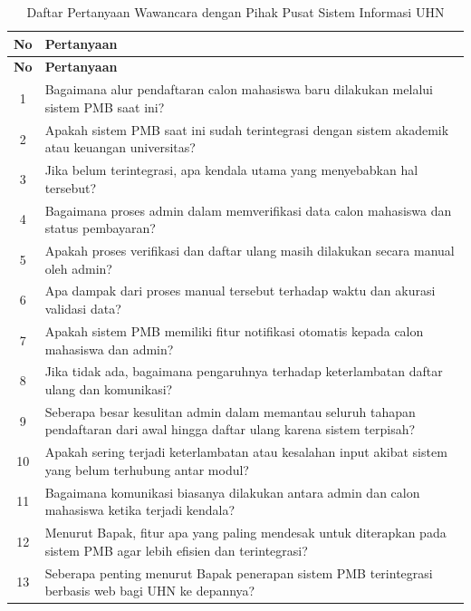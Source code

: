 \begin{longtable}{|c|p{}|}
	\caption{Daftar Pertanyaan Wawancara dengan Pihak Pusat Sistem Informasi UHN}
	\label{table:3.wawancara}\\
	\hline
	\textbf{No} & \textbf{Pertanyaan} \\
	\hline
	\endfirsthead
	\hline
	\textbf{No} & \textbf{Pertanyaan} \\
	\hline
	\endhead
	1 & Bagaimana alur pendaftaran calon mahasiswa baru dilakukan melalui sistem PMB saat ini? \\
	\hline
	2 & Apakah sistem PMB saat ini sudah terintegrasi dengan sistem akademik atau keuangan universitas? \\
	\hline
	3 & Jika belum terintegrasi, apa kendala utama yang menyebabkan hal tersebut? \\
	\hline
	4 & Bagaimana proses admin dalam memverifikasi data calon mahasiswa dan status pembayaran? \\
	\hline
	5 & Apakah proses verifikasi dan daftar ulang masih dilakukan secara manual oleh admin? \\
	\hline
	6 & Apa dampak dari proses manual tersebut terhadap waktu dan akurasi validasi data? \\
	\hline
	7 & Apakah sistem PMB memiliki fitur notifikasi otomatis kepada calon mahasiswa dan admin? \\
	\hline
	8 & Jika tidak ada, bagaimana pengaruhnya terhadap keterlambatan daftar ulang dan komunikasi? \\
	\hline
	9 & Seberapa besar kesulitan admin dalam memantau seluruh tahapan pendaftaran dari awal hingga daftar ulang karena sistem terpisah? \\
	\hline
	10 & Apakah sering terjadi keterlambatan atau kesalahan input akibat sistem yang belum terhubung antar modul? \\
	\hline
	11 & Bagaimana komunikasi biasanya dilakukan antara admin dan calon mahasiswa ketika terjadi kendala? \\
	\hline
	12 & Menurut Bapak, fitur apa yang paling mendesak untuk diterapkan pada sistem PMB agar lebih efisien dan terintegrasi? \\
	\hline
	13 & Seberapa penting menurut Bapak penerapan sistem PMB terintegrasi berbasis web bagi UHN ke depannya? \\
	\hline
\end{longtable}

